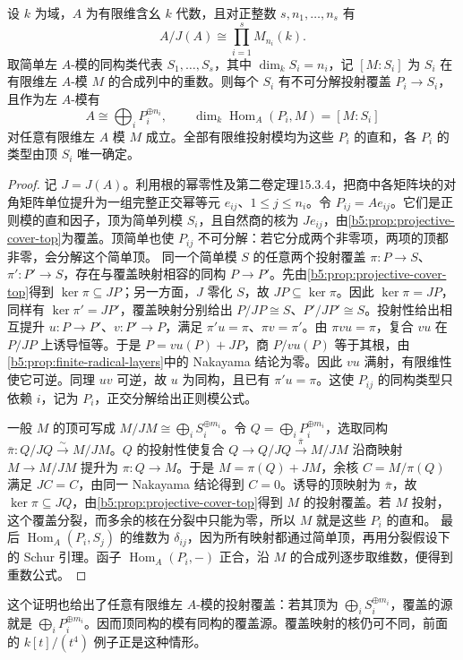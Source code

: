 \begin{theorem}\label{b5:thm:split-projective-covers}
	设 \(k\) 为域，\(A\) 为有限维含幺 \(k\) 代数，且对正整数 \(s,n_1,\ldots,n_s\) 有
	\[
		A/J(A)\cong\prod_{i=1}^sM_{n_i}(k).
	\]
	取简单左 \(A\)-模的同构类代表 \(S_1,\ldots,S_s\)，其中 \(\dim_kS_i=n_i\)，记 \([M:S_i]\) 为 \(S_i\) 在有限维左 \(A\)-模 \(M\) 的合成列中的重数。则每个 \(S_i\) 有不可分解投射覆盖 \(P_i\to S_i\)，且作为左 \(A\)-模有
	\[
		A\cong\bigoplus_iP_i^{\oplus n_i},\qquad \dim_k\operatorname{Hom}_A(P_i,M)=[M:S_i]
	\]
	对任意有限维左 \(A\) 模 \(M\) 成立。全部有限维投射模均为这些 \(P_i\) 的直和，各 \(P_i\) 的类型由顶 \(S_i\) 唯一确定。
\end{theorem}
\begin{proof}
	记 \(J=J(A)\)。利用根的幂零性及第二卷定理15.3.4，把商中各矩阵块的对角矩阵单位提升为一组完整正交幂等元 \(e_{ij}\)、\(1\le j\le n_i\)。令 \(P_{ij}=Ae_{ij}\)。它们是正则模的直和因子，顶为简单列模 \(S_i\)，且自然商的核为 \(Je_{ij}\)，由\cref{b5:prop:projective-cover-top}为覆盖。顶简单也使 \(P_{ij}\) 不可分解：若它分成两个非零项，两项的顶都非零，会分解这个简单顶。 同一个简单模 \(S\) 的任意两个投射覆盖 \(\pi:P\to S\)、\(\pi':P'\to S\)，存在与覆盖映射相容的同构 \(P\to P'\)。先由\cref{b5:prop:projective-cover-top}得到 \(\ker\pi\subseteq JP\)；另一方面，\(J\) 零化 \(S\)，故 \(JP\subseteq\ker\pi\)。因此 \(\ker\pi=JP\)，同样有 \(\ker\pi'=JP'\)，覆盖映射分别给出 \(P/JP\cong S\)、\(P'/JP'\cong S\)。投射性给出相互提升 \(u:P\to P'\)、\(v:P'\to P\)，满足 \(\pi'u=\pi\)、\(\pi v=\pi'\)。由 \(\pi vu=\pi\)，复合 \(vu\) 在 \(P/JP\) 上诱导恒等。于是 \(P=vu(P)+JP\)，商 \(P/vu(P)\) 等于其根，由\cref{b5:prop:finite-radical-layers}中的 Nakayama 结论为零。因此 \(vu\) 满射，有限维性使它可逆。同理 \(uv\) 可逆，故 \(u\) 为同构，且已有 \(\pi'u=\pi\)。这使 \(P_{ij}\) 的同构类型只依赖 \(i\)，记为 \(P_i\)，正交分解给出正则模公式。

	一般 \(M\) 的顶可写成 \(M/JM\cong\bigoplus_iS_i^{\oplus m_i}\)。令 \(Q=\bigoplus_iP_i^{\oplus m_i}\)，选取同构 \(\bar\pi:Q/JQ\xrightarrow{\sim}M/JM\)。\(Q\) 的投射性使复合 \(Q\to Q/JQ\xrightarrow{\bar\pi}M/JM\) 沿商映射 \(M\to M/JM\) 提升为 \(\pi:Q\to M\)。于是 \(M=\pi(Q)+JM\)，余核 \(C=M/\pi(Q)\) 满足 \(JC=C\)，由同一 Nakayama 结论得到 \(C=0\)。诱导的顶映射为 \(\bar\pi\)，故 \(\ker\pi\subseteq JQ\)，由\cref{b5:prop:projective-cover-top}得到 \(M\) 的投射覆盖。若 \(M\) 投射，这个覆盖分裂，而多余的核在分裂中只能为零，所以 \(M\) 就是这些 \(P_i\) 的直和。 最后 \(\operatorname{Hom}_A(P_i,S_j)\) 的维数为 \(\delta_{ij}\)，因为所有映射都通过简单顶，再用分裂假设下的 Schur 引理。函子 \(\operatorname{Hom}_A(P_i,-)\) 正合，沿 \(M\) 的合成列逐步取维数，便得到重数公式。
\end{proof}
这个证明也给出了任意有限维左 \(A\)-模的投射覆盖：若其顶为 \(\bigoplus_iS_i^{\oplus m_i}\)，覆盖的源就是 \(\bigoplus_iP_i^{\oplus m_i}\)。因而顶同构的模有同构的覆盖源。覆盖映射的核仍可不同，前面的 \(k[t]/(t^4)\) 例子正是这种情形。

